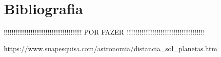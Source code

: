 \documentclass[a4paper]{article}
\begin{document}
\section{Bibliografia}
\label{sec:bibliografia}

!!!!!!!!!!!!!!!!!!!!!!!!!!!!!!!!!!!!!!!!! POR FAZER !!!!!!!!!!!!!!!!!!!!!!!!!!!!!!!!!!!!!!!!!

https://www.suapesquisa.com/astronomia/distancia\_sol\_planetas.htm
\end{document}
